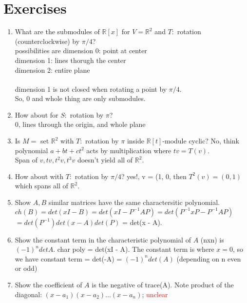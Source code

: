 \documentclass[12pt]{article}
\def\R{\ensuremath{\mathbb{R}}} %
\newcommand{\gray}[1]{\textcolor[gray]{0.5}{#1}} %
\begin{document}
\section*{Exercises}
\begin{enumerate}
    \item What are the submodules of $\R[x]$ for $V = \R^2$ and $T:$ rotation (counterclockwise) by $\pi / 4$? \\
\textcolor[gray]{0.5}{
possibilities are
dimension 0: point at center\\
dimension 1: lines thorugh the center \\
dimension 2: entire plane\\
\ \\
dimension 1 is not closed when rotating a point by $\pi / 4$. \\
So, 0 and whole thing are only submodules.
}
    \item How about for $S:$ rotation by $\pi$?\\
\textcolor[gray]{0.5}{0, lines through the origin, and whole plane}

    \item Is $M =$ set $\R^2$ with $T :$ rotation by $\pi$ inside $\R[t]$-module cyclic? 
    \gray{No, think polynomial $a + bt + ct^2$ acts by multiplication where $tv = T(v)$.\\
    Span of $v, tv, t^2v, t^3v$ doesn't yield all of $\R^2$.
    }

    \item How about with $T: $ rotation by $\pi / 4$?
    \gray{yes!, v = (1, 0, then $T^2(v) = (0, 1)$ which spans all of $\R^2$.}


    \item Show $A, B$ similar matrices have the same charactersitic polynomial. \\
    \gray{$ch(B) = det(xI - B) = det(xI - P^{-1}AP) = det(P^{-1}x P - P^{-1} AP)$\\
    $= det(P^{-1})det(x - A)det(P)$ = det(x - A).}

    \item Show the constant term in the characteristic polynomial of $A$ (nxn) is $(-1)^n det A$. 
    \gray{char poly = det(xI - A). The constant term is where $x=0$, so we have constant term = det(-A) = $(-1)^n det(A)$ (depending on n even or odd)}
    \item Show the coefficient of $A$ is the negative of trace(A).
    \gray{Note product of the diagonal: $(x-a_1)(x-a_2) \dots (x- a_n)$; \textcolor{red}{unclear}}
\end{enumerate}
\end{document}
